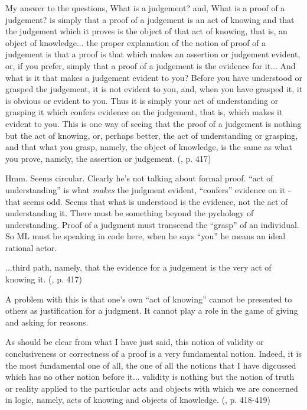 \begin{displayquote}
My answer to the questions, What is a judgement? and, What is a proof
of a judgement? is simply that a proof of a judgement is an act of
knowing and that the judgement which it proves is the object of that
act of knowing, that is, an object of knowledge... the proper explanation of the notion of proof of a judgement is that a proof is that which makes an assertion or judgement evident, or, if you prefer, simply that a proof of a judgement is the evidence for it...
And what is it that makes a judgement evident to you? Before you have understood or grasped the judgement, it is not evident to you, and, when you have grasped it, it is obvious or evident to you. Thus it is simply your act of understanding or grasping it which confers evidence on the judgement, that is, which makes it evident to you. This is one way of seeing that the proof of a judgement is nothing but the act of knowing, or, perhaps better, the act of understanding or grasping, and that what you grasp, namely, the object of knowledge, is the same as what you prove, namely, the assertion or judgement.
(\parencite{martin1987truth}, p. 417)
\end{displayquote}

Hmm. Seems circular. Clearly he's not talking about formal proof.
``act of understanding'' is what \textit{makes} the judgment evident,
``confers'' evidence on it - that seems odd. Seems that what is
understood is the evidence, not the act of understanding it. There
must be something beyond the pychology of understanding. Proof of a
judgment must transcend the ``grasp'' of an individual. So ML must be
speaking in code here, when he says ``you'' he means an ideal rational
actor.

\begin{displayquote}
...third path, namely, that the evidence for a judgement is the very act of knowing it.
(\parencite{martin1987truth}, p. 417)
\end{displayquote}

A problem with this is that one's own ``act of knowing'' cannot be presented to others as justification for a judgment. It cannot play a role in the game of giving and asking for reasons.


\begin{displayquote}
As should be clear from what I have just said, this notion of validity
or conclusiveness or correctness of a proof is a very fundamental
notion. Indeed, it is the most fundamental one of all, the one of all
the notions that I have digcussed which has no other notion before
it... validity is nothing but the notion of truth or reality applied
to the particular acts and objects with which we are concerned in
logic, namely, acts of knowing and objects of knowledge.
(\parencite{martin1987truth}, p. 418-419)
\end{displayquote}


